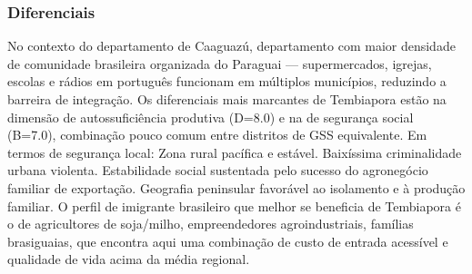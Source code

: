\subsubsection*{Diferenciais}\label{dif-tembiapora-0521}
No contexto do departamento de Caaguazú, departamento com maior densidade de comunidade brasileira organizada do Paraguai — supermercados, igrejas, escolas e rádios em português funcionam em múltiplos municípios, reduzindo a barreira de integração. Os diferenciais mais marcantes de Tembiapora estão na dimensão de autossuficiência produtiva (D=8.0) e na de segurança social (B=7.0), combinação pouco comum entre distritos de GSS equivalente. Em termos de segurança local: Zona rural pacífica e estável. Baixíssima criminalidade urbana violenta. Estabilidade social sustentada pelo sucesso do agronegócio familiar de exportação. Geografia peninsular favorável ao isolamento e à produção familiar. O perfil de imigrante brasileiro que melhor se beneficia de Tembiapora é o de agricultores de soja/milho, empreendedores agroindustriais, famílias brasiguaias, que encontra aqui uma combinação de custo de entrada acessível e qualidade de vida acima da média regional.

